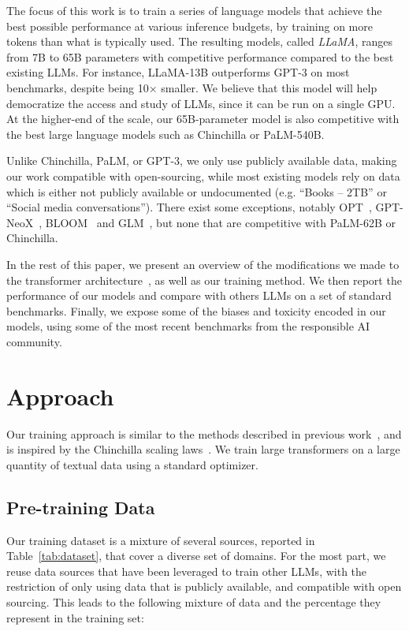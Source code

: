  The focus of this work is to train a series of language models that achieve the best possible performance at various inference budgets, by training on more tokens than what is typically used. The resulting models, called \emph{LLaMA}, ranges from 7B to 65B parameters with competitive performance compared to the best existing LLMs. For instance, LLaMA-13B outperforms GPT-3 on most benchmarks, despite being 10$\times$ smaller. We believe that this model will help democratize the access and study of LLMs, since it can be run on a single GPU. At the higher-end of the scale, our 65B-parameter model is also competitive with the best large language models such as Chinchilla or PaLM-540B.

 Unlike Chinchilla, PaLM, or GPT-3, we only use publicly available data, making our work compatible with open-sourcing, while most existing models rely on data which is either not publicly available or undocumented (e.g. ``Books -- 2TB'' or ``Social media conversations''). There exist some exceptions, notably OPT~\citep{zhang2022opt}, GPT-NeoX~\citep{black2022gpt}, BLOOM~\citep{scao2022bloom} and GLM~\citep{zhengGLM2022}, but none that are competitive with PaLM-62B or Chinchilla.

In the rest of this paper, we present an overview of the modifications we made to the transformer architecture~\cite{vaswaniAttention2017}, as well as our training method. We then report the performance of our models and compare with others LLMs on a set of standard benchmarks. Finally, we expose some of the biases and toxicity encoded in our models, using some of the most recent benchmarks from the responsible AI community.

\section{Approach}
Our training approach is similar to the methods described in previous work~\cite{brown2020gpt3,chowdhery2022palm}, and is inspired by the Chinchilla scaling laws~\cite{hoffmann2022chinchilla}. We train large transformers on a large quantity of textual data using a standard optimizer.

\subsection{Pre-training Data} Our training dataset is a mixture of several sources, reported in Table~\ref{tab:dataset}, that cover a diverse set of domains. For the most part, we reuse data sources that have been leveraged to train other LLMs, with the restriction of only using data that is publicly available, and compatible with open sourcing. This leads to the following mixture of data and the percentage they represent in the training set:

